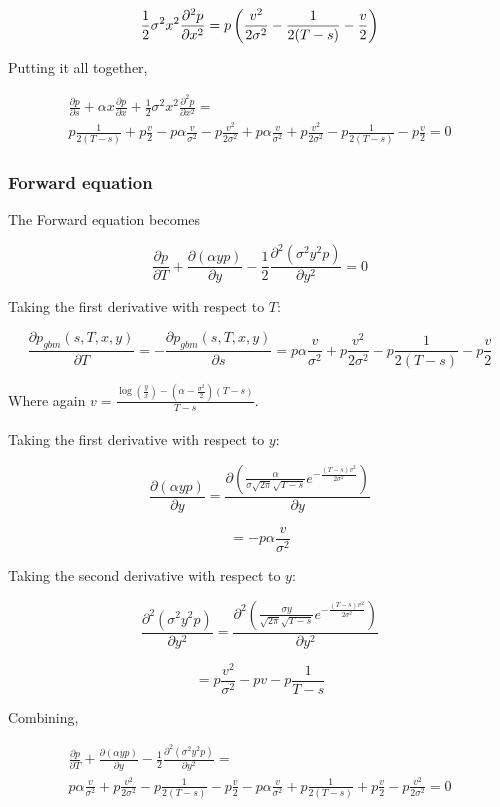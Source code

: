 \documentclass{article}
\theoremstyle{definition}
\begin{document}
\[\frac{1}{2} \sigma^2 x^2 \frac{\partial^2 p}{\partial x^2}\\=p\left( \frac{v^2 }{2\sigma^2}- \frac{1}{ 2(T-s)} - \frac{v }{ 2}      \right)\]

Putting it all together,


\begin{multline*}
\frac{\partial p} {\partial s} +\alpha x \frac{\partial p}{\partial x} + \frac{1}{2} \sigma^2 x^2 \frac{\partial^2 p}{\partial x^2}= \\ p\frac{1}{2(T-s)} + p\frac{v}{2}   - p \alpha \frac{v}{\sigma^2}  -p\frac{v^2}{2\sigma^2}  +  p \alpha \frac{v }{\sigma^2} + p\frac{v^2 }{2\sigma^2 }- p\frac{1}{ 2(T-s)} -p \frac{v }{ 2} =0
\end{multline*}

\subsubsection{Forward equation}
The Forward equation becomes

\[\frac{\partial p} {\partial T}+\frac{\partial \left(\alpha y p\right)}{\partial y}-\frac{1}{2} \frac{\partial^2 \left(\sigma^2 y^2 p\right)}{\partial y^2} =0 \]

Taking the first derivative with respect to \(T\):

\[\frac{\partial p_{gbm}(s, T, x, y)}{\partial T}=  -\frac{\partial p_{gbm}(s, T, x, y)}{\partial s} = p \alpha \frac{v}{\sigma^2} + p\frac{v^2}{2\sigma^2}- p\frac{1}{2(T-s)}- p\frac{v}{2}    \]

Where again \(v=\frac{ \log\left(\frac{y}{x}\right) -\left(\alpha-\frac{\sigma^2}{2}\right)(T-s)}{T-s}\).
\\
\\
Taking the first derivative with respect to \(y\):

\[\frac{\partial \left(\alpha y p\right)}{\partial y}= \frac{\partial \left(\frac{\alpha}{\sigma \sqrt{2\pi} \sqrt{T-s} } e^{-\frac{(T-s)v^2}{2\sigma^2}}\right)}{\partial y} \]

\[=-p\alpha\frac{v }{\sigma^2}\]

Taking the second derivative with respect to \(y\):

\[\frac{\partial^2 \left(\sigma^2 y^2 p\right)}{\partial y^2}=\frac{\partial^2 \left(\frac{\sigma y }{\sqrt{2\pi} \sqrt{T-s} } e^{-\frac{(T-s)v^2}{2\sigma^2}}\right)}{\partial y^2} \]

\[=p\frac{v^2}{\sigma^2} -p v-p \frac{1}{T-s} \]

Combining, 

\begin{multline*} \frac{\partial p} {\partial T}+\frac{\partial \left(\alpha y p\right)}{\partial y}-\frac{1}{2} \frac{\partial^2 \left(\sigma^2 y^2 p\right)}{\partial y^2}= \\p \alpha \frac{v}{\sigma^2} + p\frac{v^2}{2\sigma^2}- p\frac{1}{2(T-s)}- p\frac{v}{2}- p\alpha\frac{v }{\sigma^2} +  p \frac{1}{2(T-s)} +p \frac{v}{2}- p\frac{v^2}{2\sigma^2}=0\end{multline*}
\end{document}
